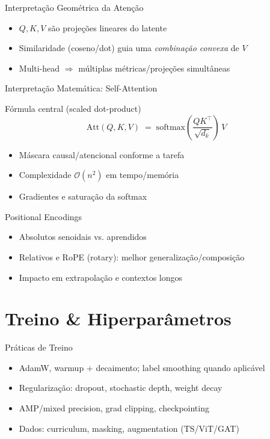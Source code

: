 \documentclass{beamer}
\begin{document}
\begin{frame}{Interpretação Geométrica da Atenção}
	\begin{itemize}
		\item $Q,K,V$ são projeções lineares do latente
		\item Similaridade (coseno/dot) guia uma \emph{combinação convexa} de $V$
		\item Multi-head $\Rightarrow$ múltiplas métricas/projeções simultâneas
	\end{itemize}
\end{frame}

\begin{frame}{Interpretação Matemática: Self-Attention}
	\begin{block}{Fórmula central (scaled dot-product)}
		\[
			\mathrm{Att}(Q,K,V) \;=\; \mathrm{softmax}\!\left(\frac{QK^\top}{\sqrt{d_k}}\right)\,V
		\]
	\end{block}
	\begin{itemize}
		\item Máscara causal/atencional conforme a tarefa
		\item Complexidade $\mathcal{O}(n^2)$ em tempo/memória
		\item Gradientes e saturação da softmax
	\end{itemize}
\end{frame}

\begin{frame}{Positional Encodings}
	\begin{itemize}
		\item Absolutos senoidais vs. aprendidos
		\item Relativos e RoPE (rotary): melhor generalização/composição
		\item Impacto em extrapolação e contextos longos
	\end{itemize}
\end{frame}

\section{Treino \& Hiperparâmetros}
\begin{frame}{Práticas de Treino}
	\begin{itemize}
		\item AdamW, warmup + decaimento; label smoothing quando aplicável
		\item Regularização: dropout, stochastic depth, weight decay
		\item AMP/mixed precision, grad clipping, checkpointing
		\item Dados: curriculum, masking, augmentation (TS/ViT/GAT)
	\end{itemize}
\end{frame}
\end{document}
